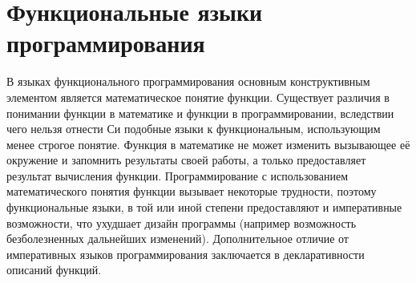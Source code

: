 


\section{Функциональные языки программирования}
В языках функционального программирования основным конструктивным
элементом является математическое понятие функции. Существует различия
в понимании функции в математике и функции в программировании,
вследствии чего нельзя отнести Си подобные языки к функциональным,
использующим менее строгое понятие. Функция в математике не может
изменить вызывающее её окружение и запомнить результаты своей работы,
а только предоставляет результат вычисления функции. Программирование
с использованием математического понятия функции вызывает некоторые
трудности, поэтому функциональные языки, в той или иной степени
предоставляют и императивные возможности, что ухудшает дизайн
программы (например возможность безболезненных дальнейших изменений).
Дополнительное отличие от императивных языков программирования
заключается в декларативности описаний функций.

